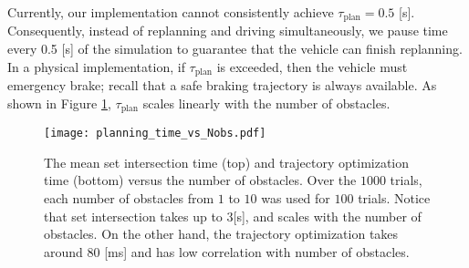 Currently, our implementation cannot consistently achieve $\tau_\text{plan} = 0.5$ [s].
Consequently, instead of replanning and driving simultaneously, we pause time every 0.5 [s] of the simulation to guarantee that the vehicle can finish replanning.
In a physical implementation, if $\tau_\text{plan}$ is exceeded, then the vehicle must emergency brake; recall that a safe braking trajectory is always available.
As shown in Figure \ref{fig:planning_time_vs_Nobs}, $\tau_\text{plan}$ scales linearly with the number of obstacles.

\begin{figure}
\centering
\texttt{[image: planning\_time\_vs\_Nobs.pdf]}
\caption{The mean set intersection time (top) and trajectory optimization time (bottom) versus the number of obstacles. Over the $1000$ trials, each number of obstacles from $1$ to $10$ was used for $100$ trials. Notice that set intersection takes up to $3$[s], and scales with the number of obstacles. On the other hand, the trajectory optimization takes around $80$ [ms] and has low correlation with number of obstacles.}
\label{fig:planning_time_vs_Nobs}
\end{figure}



